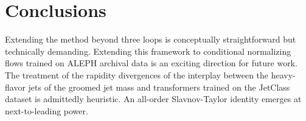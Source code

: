 \section{Conclusions}\label{sec:conclusions}

Extending the method beyond three loops is conceptually straightforward
but technically demanding. Extending this framework to conditional
normalizing flows trained on ALEPH archival data is an exciting
direction for future work. The treatment of the rapidity divergences of
the interplay between the heavy-flavor jets of the groomed jet mass and
transformers trained on the JetClass dataset is admittedly heuristic. An
all-order Slavnov-Taylor identity emerges at next-to-leading power.

